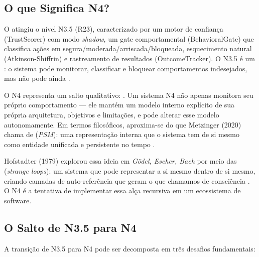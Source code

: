 \subsection{O que Significa N4?}

O \opencodeeco{} atingiu o nível N3.5 (R23), caracterizado por um motor
de confiança (TrustScorer) com modo \textit{shadow}, um gate comportamental
(BehavioralGate) que classifica ações em segura/moderada/arriscada/bloqueada,
esquecimento natural (Atkinson-Shiffrin) e rastreamento de resultados
(OutcomeTracker). O N3.5 é um : o sistema
pode monitorar, classificar e bloquear comportamentos indesejados, mas
não pode ainda .

O N4 representa um salto qualitativo: . Um sistema N4 não apenas monitora seu próprio
comportamento --- ele mantém um modelo interno explícito de sua própria
arquitetura, objetivos e limitações, e pode alterar esse modelo
autonomamente. Em termos filosóficos, aproxima-se do que Metzinger (2020)
chama de  (\textit{PSM}): uma
representação interna que o sistema tem de si mesmo como entidade
unificada e persistente no tempo \cite{metzinger2020ego}.

Hofstadter (1979) explorou essa ideia em \textit{Gödel, Escher, Bach} por
meio das  (\textit{strange loops}):
um sistema que pode representar a si mesmo dentro de si mesmo, criando
camadas de auto-referência que geram o que chamamos de consciência
\cite{hofstadter1979gedel}. O N4 é a tentativa de implementar essa alça
recursiva em um ecossistema de software.

\subsection{O Salto de N3.5 para N4}

A transição de N3.5 para N4 pode ser decomposta em três desafios
fundamentais:

